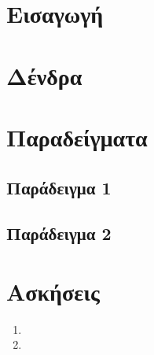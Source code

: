 \section{Εισαγωγή}

\section{Δένδρα}


\section{Παραδείγματα}

\subsection{Παράδειγμα 1}

\subsection{Παράδειγμα 2}


\section{Ασκήσεις}
\begin{enumerate}
\item 
\item 
\end{enumerate}

\begin{thebibliography}{9}
\end{thebibliography}


